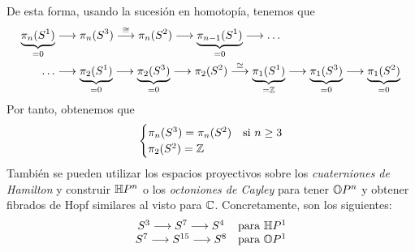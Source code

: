 \begin{enumerate}
De esta forma, usando la sucesión en homotopía, tenemos que 
\begin{align*}
\underbrace{\homot{n}{S^1}}_{\text{=0}} &\longrightarrow \homot{n}{S^3} \stackrel{\cong}{\longrightarrow} \homot{n}{S^2} \longrightarrow \underbrace{\homot{n-1}{S^1}}_{\text{=0}} \longrightarrow \dots \\ 
\dots &\longrightarrow \underbrace{\homot{2}{S^1}}_{\text{=0}} \longrightarrow \underbrace{\homot{2}{S^3}}_{\text{=0}} \longrightarrow \homot{2}{S^2} \stackrel{\cong}{\longrightarrow} \underbrace{\homot{1}{S^1}}_{\text{=}\bb{Z}} \longrightarrow \underbrace{\homot{1}{S^3}}_{\text{=0}} \longrightarrow \underbrace{\homot{1}{S^2}}_{\text{=0}}
\end{align*}
Por tanto, obtenemos que
\[
\begin{cases}
\pi_{n}(S^3) = \pi_{n}(S^2) & \text{si } n \geq 3 \\
\pi_{2}(S^2) = \mathbb{Z}
\end{cases}
\]
También se pueden utilizar los espacios proyectivos sobre los \textit{cuaterniones de Hamilton} y construir $\mathbb{H}P^n$ o los \textit{octoniones de Cayley} para tener $\mathbb{O}P^n$ y obtener fibrados de Hopf similares al visto para  $\mathbb{C}$. Concretamente, son los siguientes:
\[
\begin{matrix}
S^3 \longrightarrow S^7 \longrightarrow S^4 & \text{para } \bb{H}P^1 \\
S^7 \longrightarrow S^{15} \longrightarrow S^8 & \text{para } \bb{O}P^1
\end{matrix}
\]
\end{enumerate}
